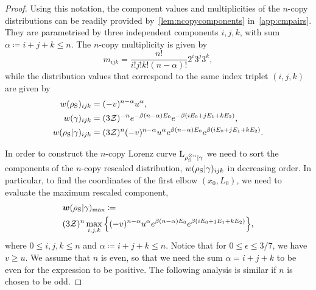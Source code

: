 \documentclass[pra,
aps,
twocolumn,
superscriptaddress,
groupedaddress,
nofootinbib,
reprint
]{revtex4-1}
\begin{document}
\begin{proof}
Using this notation, the component values and multiplicities of the $n$-copy distributions can be readily provided by~\cref{lem:ncopycomponents} in~\cref{app:cmpairs}.
They are parametrised by three independent components $i,j,k$, with sum $\alpha \coloneqq i+j+k \leq n$.
The $n$-copy multiplicity is given by
\begin{equation}
	m_{ijk} = \frac{n!}{i!j!k!(n-\alpha)!} 2^i 3^j 3^k,
\end{equation}
while the distribution values that correspond to the same index triplet $(i,j,k)$ are given by
\begin{align}
	w(\rho_{\rm{S}})_{ijk} &= (-v)^{n-\alpha} u^{\alpha}, \\
	w(\gamma)_{ijk} &= (3\mathcal{Z})^{-n} e^{-\beta (n-\alpha)E_0} e^{-\beta ( i E_0 + j E_1 + k E_2 )}, \\
	w(\rho_{\rm{S}} | \gamma)_{ijk} &= (3\mathcal{Z})^{n} (-v)^{n-\alpha} u^{\alpha} e^{\beta (n-\alpha)E_0} e^{\beta ( i E_0 + j E_1 + k E_2 )}.
\end{align}

In order to construct the $n$-copy Lorenz curve ${{\rm{L}}_{\rho_{\rm{S}}^{\otimes n}|\gamma}}$ we need to sort the components of the $n$-copy rescaled distribution, $w(\rho_{\rm{S}} | \gamma)_{ijk}$ in decreasing order.
In particular, to find the coordinates of the first elbow $(x_0, L_0)$, we need to evaluate the maximum rescaled component,
\begin{align}
	&\bm{w}(\rho_{\rm{S}} | \gamma)_{\rm{max}} \coloneqq \label{eq:max_slope}\\
	&(3\mathcal{Z})^{n} \max\limits_{i,j,k}\Big\{ (-v)^{n-\alpha} u^{\alpha} e^{\beta (n-\alpha)E_0} e^{\beta ( i E_0 + j E_1 + k E_2 )} \Big\}, \nonumber
\end{align}
where $0 \leq i,j,k \leq n$ and $\alpha \coloneqq i+j+k \leq n$.
Notice that for $0 \leq \epsilon \leq 3/7$, we have $v \geq u$. 
We assume that $n$ is even, so that we need the sum $\alpha = i+j+k$ to be even for the expression to be positive. 
The following analysis is similar if $n$ is chosen to be odd.


\end{proof}
\end{document}
